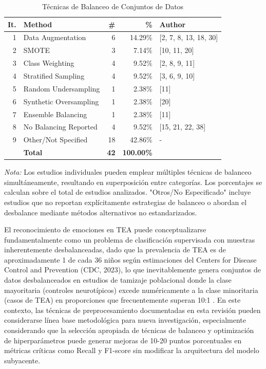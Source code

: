 \documentclass{ieeeaccess}
\begin{document}
	\begin{table}[htbp]
		\caption{Técnicas de Balanceo de Conjuntos de Datos}
		\label{tab:balanceo}
		\centering
		\footnotesize
		\begin{tabular}{|r|p{60pt}|r|r|p{70pt}|}
			\hline
			\textbf{It.} & \textbf{Method} & \textbf{\#} & \textbf{\%} & \textbf{Author} \\
			\hline
			1 & Data Augmentation & 6 & 14.29\% & [2, 7, 8, 13, 18, 30] \\
			2 & SMOTE & 3 & 7.14\% & [10, 11, 20] \\
			3 & Class Weighting & 4 & 9.52\% & [2, 8, 9, 11] \\
			4 & Stratified Sampling & 4 & 9.52\% & [3, 6, 9, 10] \\
			5 & Random Undersampling & 1 & 2.38\% & [11] \\
			6 & Synthetic Oversampling & 1 & 2.38\% & [20] \\
			7 & Ensemble Balancing & 1 & 2.38\% & [11] \\
			8 & No Balancing Reported & 4 & 9.52\% & [15, 21, 22, 38] \\
			9 & Other/Not Specified & 18 & 42.86\% & - \\
			\hline
			& \textbf{Total} & \textbf{42} & \textbf{100.00\%} & \\
			\hline
		\end{tabular}
		\begin{flushleft}
			\small \textit{Nota:} Los estudios individuales pueden emplear múltiples técnicas de balanceo simultáneamente, resultando en superposición entre categorías. Los porcentajes se calculan sobre el total de estudios analizados. "Otros/No Especificado" incluye estudios que no reportan explícitamente estrategias de balanceo o abordan el desbalance mediante métodos alternativos no estandarizados.
		\end{flushleft}
	\end{table}
	
	El reconocimiento de emociones en TEA puede conceptualizarse fundamentalmente como un problema de clasificación supervisada con muestras inherentemente desbalanceadas, dado que la prevalencia de TEA es de aproximadamente 1 de cada 36 niños según estimaciones del Centers for Disease Control and Prevention (CDC, 2023), lo que inevitablemente genera conjuntos de datos desbalanceados en estudios de tamizaje poblacional donde la clase mayoritaria (controles neurotípicos) excede numéricamente a la clase minoritaria (casos de TEA) en proporciones que frecuentemente superan 10:1 \cite{b3}. En este contexto, las técnicas de preprocesamiento documentadas en esta revisión pueden considerarse línea base metodológica para nueva investigación, especialmente considerando que la selección apropiada de técnicas de balanceo y optimización de hiperparámetros puede generar mejoras de 10-20 puntos porcentuales en métricas críticas como Recall y F1-score sin modificar la arquitectura del modelo subyacente.
	
\end{document}

